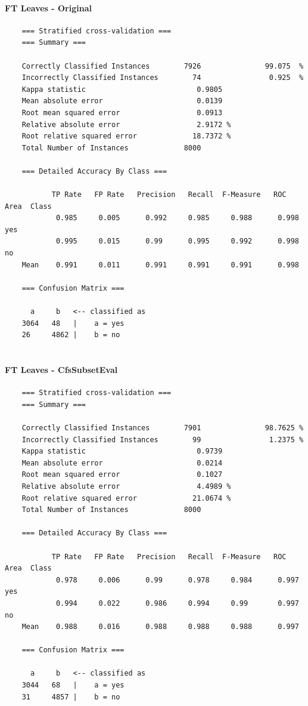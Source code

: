 \paragraph{FT Leaves - Original}
{\footnotesize
	\begin{verbatim}
	=== Stratified cross-validation ===
	=== Summary ===
	
	Correctly Classified Instances        7926               99.075  %
	Incorrectly Classified Instances        74                0.925  %
	Kappa statistic                          0.9805
	Mean absolute error                      0.0139
	Root mean squared error                  0.0913
	Relative absolute error                  2.9172 %
	Root relative squared error             18.7372 %
	Total Number of Instances             8000     
	
	=== Detailed Accuracy By Class ===
	
	       TP Rate   FP Rate   Precision   Recall  F-Measure   ROC Area  Class
	        0.985     0.005      0.992     0.985     0.988      0.998    yes
	        0.995     0.015      0.99      0.995     0.992      0.998    no
	Mean    0.991     0.011      0.991     0.991     0.991      0.998
	
	=== Confusion Matrix ===
	
	  a     b   <-- classified as
	3064   48   |    a = yes
	26     4862 |    b = no
	
	\end{verbatim}
}

\paragraph{FT Leaves - CfsSubsetEval}
{\footnotesize
	\begin{verbatim}
	=== Stratified cross-validation ===
	=== Summary ===
	
	Correctly Classified Instances        7901               98.7625 %
	Incorrectly Classified Instances        99                1.2375 %
	Kappa statistic                          0.9739
	Mean absolute error                      0.0214
	Root mean squared error                  0.1027
	Relative absolute error                  4.4989 %
	Root relative squared error             21.0674 %
	Total Number of Instances             8000     
	
	=== Detailed Accuracy By Class ===
	
	       TP Rate   FP Rate   Precision   Recall  F-Measure   ROC Area  Class
	        0.978     0.006      0.99      0.978     0.984      0.997    yes
	        0.994     0.022      0.986     0.994     0.99       0.997    no
	Mean    0.988     0.016      0.988     0.988     0.988      0.997
	
	=== Confusion Matrix ===
	
	  a     b   <-- classified as
	3044   68   |    a = yes
	31     4857 |    b = no
	
	\end{verbatim}
}

